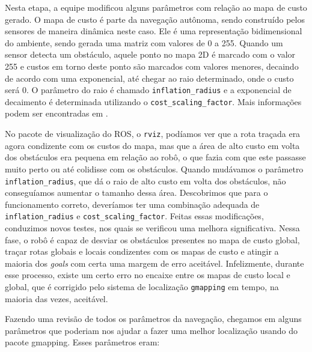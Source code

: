 Nesta etapa, a equipe modificou alguns parâmetros com relação ao mapa de custo gerado. O mapa de custo é parte da navegação autônoma, sendo construído pelos sensores de maneira dinâmica neste caso. Ele é uma representação bidimensional do ambiente, sendo gerada uma matriz com valores de 0 a 255. Quando um sensor detecta um obstáculo, aquele ponto no mapa 2D é marcado com o valor 255 e custos em torno deste ponto são marcados com valores menores, decaindo de acordo com uma exponencial, até chegar ao raio determinado, onde o custo será 0. O parâmetro do raio é chamado \verb|inflation_radius| e a exponencial de decaimento é determinada utilizando o \verb|cost_scaling_factor|.  Mais informações podem ser encontradas em \cite{costmap2D}.

No pacote de visualização do ROS, o \verb|rviz|, podíamos ver que a rota traçada era agora condizente com os custos do mapa, mas que a área de alto custo em volta dos obstáculos era pequena em relação ao robô, o que fazia com que este passasse muito perto ou até colidisse com os obstáculos. Quando mudávamos o parâmetro \verb|inflation_radius|, que dá o raio de alto custo em volta dos obstáculos, não conseguíamos aumentar o tamanho dessa área. Descobrimos que para o funcionamento correto, deveríamos ter uma combinação adequada de \verb|inflation_radius| e \verb|cost_scaling_factor|. Feitas essas modificações, conduzimos novos testes, nos quais se verificou uma melhora significativa. Nessa fase, o robô é capaz de desviar os obstáculos presentes no mapa de custo global, traçar rotas globais e locais condizentes com os mapas de custo e atingir a maioria dos \textit{goals} com certa uma margem de erro aceitável. Infelizmente, durante esse processo, existe um certo erro no encaixe entre os mapas de custo local e global, que é corrigido pelo sistema de localização \verb|gmapping| em tempo, na maioria das vezes, aceitável. 

Fazendo uma revisão de todos os parâmetros da navegação, chegamos em alguns parâmetros que poderiam nos ajudar a fazer uma melhor localização usando do pacote gmapping. Esses parâmetros eram:

